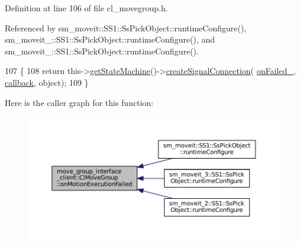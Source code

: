 Definition at line 106 of file cl\+\_\+movegroup.\+h.



Referenced by sm\+\_\+moveit\+::\+S\+S1\+::\+Ss\+Pick\+Object\+::runtime\+Configure(), sm\+\_\+moveit\+\_\+::\+S\+S1\+::\+Ss\+Pick\+Object\+::runtime\+Configure(), and sm\+\_\+moveit\+\_\+::\+S\+S1\+::\+Ss\+Pick\+Object\+::runtime\+Configure().


\begin{DoxyCode}
107   \{
108     \textcolor{keywordflow}{return} this->\hyperlink{classsmacc_1_1ISmaccClient_aec51d4712404cb9882b86e4c854bb93a}{getStateMachine}()->\hyperlink{classsmacc_1_1ISmaccStateMachine_adf0f42ade0c65cc471960fe2a7c42da2}{createSignalConnection}(
      \hyperlink{classmove__group__interface__client_1_1ClMoveGroup_a793ac2c50a1d897afe14a8780940e8ce}{onFailed\_}, \hyperlink{servers_2opencv__perception__node_2opencv__perception__node_8cpp_a050e697bd654facce10ea3f6549669b3}{callback}, \textcolor{keywordtype}{object});
109   \}
\end{DoxyCode}
Here is the caller graph for this function\+:
\nopagebreak
\begin{figure}[H]
\begin{center}
\leavevmode
\includegraphics[width=350pt]{classmove__group__interface__client_1_1ClMoveGroup_a0729ef7e1ea6500f449ccdc2c3b0e3ec_icgraph}
\end{center}
\end{figure}
\mbox{\label{classmove__group__interface__client_1_1ClMoveGroup_a04f3cafe060033b66f3fac27f744a043}} 
